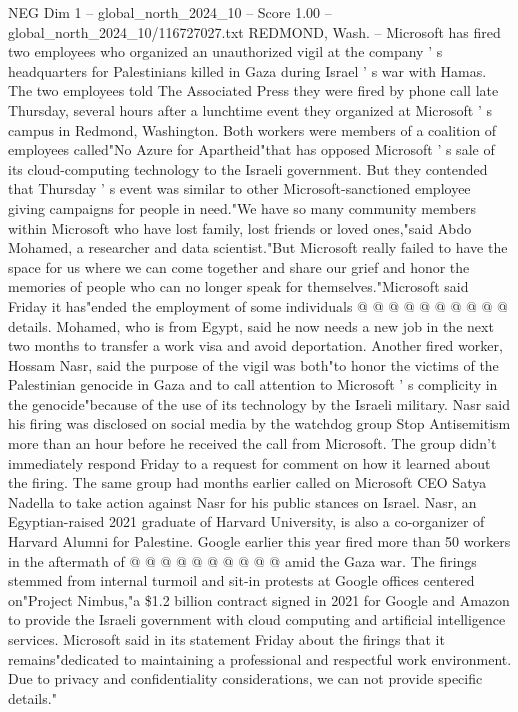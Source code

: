 \begin{textsample}{NEG Dim 1 – global\_north\_2024\_10 – Score 1.00 – global\_north\_2024\_10/116727027.txt}  \label{ex:f1_neg_074}
REDMOND, Wash. -- Microsoft has fired two employees who organized an unauthorized vigil at the company ' s headquarters for Palestinians killed in Gaza during Israel ' s war with Hamas.
The two employees told The Associated Press they were fired by phone call late Thursday, several hours after a lunchtime event they organized at Microsoft ' s campus in Redmond, Washington.
Both workers were members of a coalition of employees called"No Azure for Apartheid"that has opposed Microsoft ' s sale of its cloud-computing technology to the Israeli government.
But they contended that Thursday ' s event was similar to other Microsoft-sanctioned employee giving campaigns for people in need."We have so many community members within Microsoft who have lost family, lost friends or loved ones,"said Abdo Mohamed, a researcher and data scientist."But Microsoft really failed to have the space for us where we can come together and share our grief and honor the memories of people who can no longer speak for themselves."Microsoft said Friday it has"ended the employment of some individuals @ @ @ @ @ @ @ @ @ @ details.
Mohamed, who is from Egypt, said he now needs a new job in the next two months to transfer a work visa and avoid deportation.
Another fired worker, Hossam Nasr, said the purpose of the vigil was both"to honor the victims of the Palestinian genocide in Gaza and to call attention to Microsoft ' s complicity in the genocide"because of the use of its technology by the Israeli military.
Nasr said his firing was disclosed on social media by the watchdog group Stop Antisemitism more than an hour before he received the call from Microsoft.
The group didn't immediately respond Friday to a request for comment on how it learned about the firing.
The same group had months earlier called on Microsoft CEO Satya Nadella to take action against Nasr for his public stances on Israel.
Nasr, an Egyptian-raised 2021 graduate of Harvard University, is also a co-organizer of Harvard Alumni for Palestine.
Google earlier this year fired more than 50 workers in the aftermath of @ @ @ @ @ @ @ @ @ @ amid the Gaza war.
The firings stemmed from internal turmoil and sit-in protests at Google offices centered on"Project Nimbus,"a \$1.2 billion contract signed in 2021 for Google and Amazon to provide the Israeli government with cloud computing and artificial intelligence services.
Microsoft said in its statement Friday about the firings that it remains"dedicated to maintaining a professional and respectful work environment.
Due to privacy and confidentiality considerations, we can not provide specific details."

\end{textsample}
